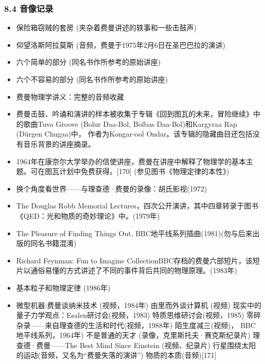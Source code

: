 \subsubsection{8.4 音像记录}
\begin{itemize}
\item 保险箱窃贼的套房 (夹杂着费曼讲述的轶事和一些击鼓声)
\item 仰望洛斯阿拉莫斯 (音频，费曼于1975年2月6日在圣巴巴拉的演讲)
\item 六个简单的部分 (同名书作所参考的原始讲座)
\item 六个不容易的部分 (同名书作所参考的原始讲座)
\item 费曼物理学讲义：完整的音频收藏
\item 费曼击鼓、吟诵和演讲的样本被收集于专辑《回到图瓦的未来，冒险继续》中的歌曲Tuva Groove (Bolur Daa-Bol, Bolbas Daa-Bol)和Kargyraa Rap (Dürgen Chugaa)中， 作者为Kongar-ool Ondar。该专辑的隐藏曲目还包括没有音乐背景的讲座摘录。
\item 1964年在康奈尔大学举办的信使讲座，费曼在讲座中解释了物理学的基本主题。可在图瓦计划中免费获得。[170] (参见图书《物理定律的本性》)
\item 换个角度看世界——与理查德·费曼的录像：胡氏影视(1972)
\item The Douglas Robb Memorial Lectures，四次公开演讲，其中四章转录于图书《QED：光和物质的奇妙理论》中。(1979年)
\item The Pleasure of Finding Things Out, BBC地平线系列插曲(1981)(勿与后来出版的同名书籍混淆)
\item Richard Feynman: Fun to Imagine CollectionBBC存档的费曼六部短片，该短片以通俗易懂的方式讲述了不同的事件背后共同的物理原理。(1983年)
\item 基本粒子和物理定律 (1986年)
\item 微型机器:费曼谈纳米技术 (视频，1984年)
由里而外谈计算机 (视频)
现实中的量子力学观点：Esalen研讨会(视频，1983)
特质思维研讨会(视频，1985)
零碎杂录——来自理查德的生活和时代(视频，1988年)
陌生度减三(视频)， BBC地平线系列，1964年)
不是普通的天才 (录像，克里斯托夫·赛克斯纪录片)
理查德·费曼——The Best Mind Since Einstein (视频、纪录片)
行星围绕太阳的运动(音频，又名为“费曼失落的演讲”)
物质的本质(音频)[171]
\end{itemize}
